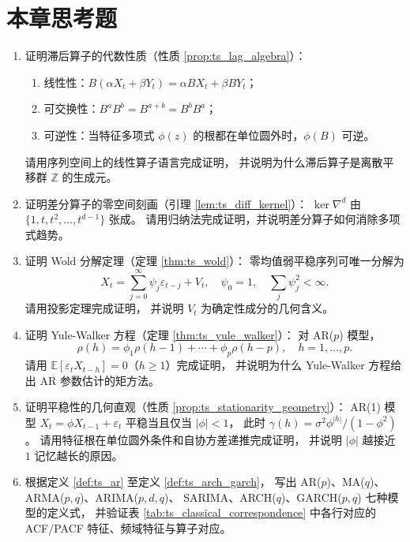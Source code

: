 \section*{本章思考题}

\begin{enumerate}[leftmargin=3em, label=\textbf{题 \arabic*}]
    \item 证明滞后算子的代数性质（性质 \ref{prop:ts_lag_algebra}）：
    \begin{enumerate}[label=(\roman*)]
        \item 线性性：$B(\alpha X_t+\beta Y_t)=\alpha BX_t+\beta BY_t$；
        \item 可交换性：$B^aB^b=B^{a+b}=B^bB^a$；
        \item 可逆性：当特征多项式 $\phi(z)$ 的根都在单位圆外时，$\phi(B)$ 可逆。
    \end{enumerate}
    请用序列空间上的线性算子语言完成证明，
    并说明为什么滞后算子是离散平移群 $\mathbb{Z}$ 的生成元。

    \item 证明差分算子的零空间刻画（引理 \ref{lem:ts_diff_kernel}）：
    $\ker\nabla^d$ 由 $\{1,t,t^2,\dots,t^{d-1}\}$ 张成。
    请用归纳法完成证明，并说明差分算子如何消除多项式趋势。

    \item 证明 Wold 分解定理（定理 \ref{thm:ts_wold}）：
    零均值弱平稳序列可唯一分解为
    \[
    X_t=\sum_{j=0}^\infty\psi_j\varepsilon_{t-j}+V_t,\quad
    \psi_0=1,\quad\sum_j\psi_j^2<\infty.
    \]
    请用投影定理完成证明，
    并说明 $V_t$ 为确定性成分的几何含义。

    \item 证明 Yule-Walker 方程（定理 \ref{thm:ts_yule_walker}）：
    对 AR($p$) 模型，
    \[
    \rho(h)=\phi_1\rho(h-1)+\cdots+\phi_p\rho(h-p),\quad h=1,\dots,p.
    \]
    请用 $\mathbb{E}[\varepsilon_tX_{t-h}]=0$（$h\ge1$）完成证明，
    并说明为什么 Yule-Walker 方程给出 AR 参数估计的矩方法。

    \item 证明平稳性的几何直观（性质 \ref{prop:ts_stationarity_geometry}）：
    AR(1) 模型 $X_t=\phi X_{t-1}+\varepsilon_t$ 平稳当且仅当 $|\phi|<1$，
    此时 $\gamma(h)=\sigma^2\phi^{|h|}/(1-\phi^2)$。
    请用特征根在单位圆外条件和自协方差递推完成证明，
    并说明 $|\phi|$ 越接近 $1$ 记忆越长的原因。

    \item 根据定义 \ref{def:ts_ar} 至定义 \ref{def:ts_arch_garch}，
    写出 AR($p$)、MA($q$)、ARMA($p,q$)、ARIMA($p,d,q$)、
    SARIMA、ARCH($q$)、GARCH($p,q$) 七种模型的定义式，
    并验证表 \ref{tab:ts_classical_correspondence} 中各行对应的
    ACF/PACF 特征、频域特征与算子对应。


\end{enumerate}
